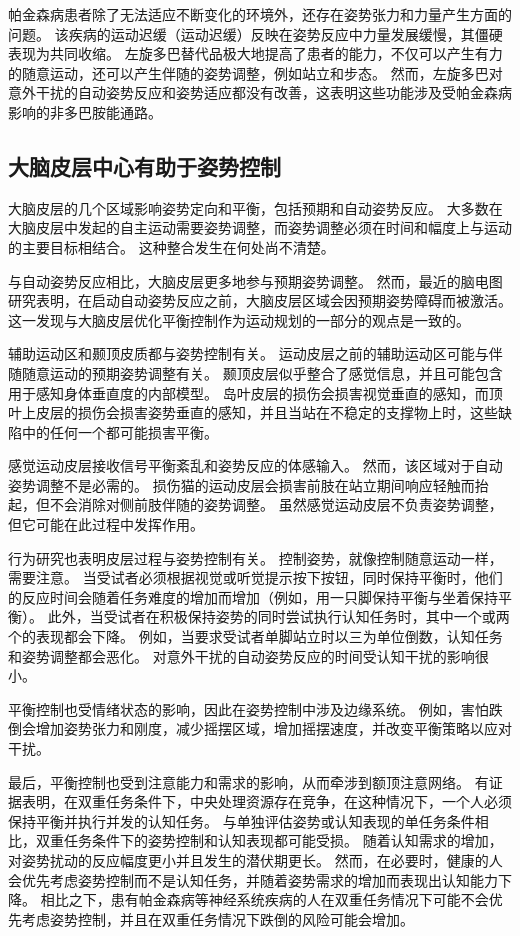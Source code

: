 帕金森病患者除了无法适应不断变化的环境外，还存在姿势张力和力量产生方面的问题。 该疾病的运动迟缓（运动迟缓）反映在姿势反应中力量发展缓慢，其僵硬表现为共同收缩。 左旋多巴替代品极大地提高了患者的能力，不仅可以产生有力的随意运动，还可以产生伴随的姿势调整，例如站立和步态。 然而，左旋多巴对意外干扰的自动姿势反应和姿势适应都没有改善，这表明这些功能涉及受帕金森病影响的非多巴胺能通路。

\subsection{大脑皮层中心有助于姿势控制}
大脑皮层的几个区域影响姿势定向和平衡，包括预期和自动姿势反应。 大多数在大脑皮层中发起的自主运动需要姿势调整，而姿势调整必须在时间和幅度上与运动的主要目标相结合。 这种整合发生在何处尚不清楚。

与自动姿势反应相比，大脑皮层更多地参与预期姿势调整。 然而，最近的脑电图研究表明，在启动自动姿势反应之前，大脑皮层区域会因预期姿势障碍而被激活。 这一发现与大脑皮层优化平衡控制作为运动规划的一部分的观点是一致的。

辅助运动区和颞顶皮质都与姿势控制有关。 运动皮层之前的辅助运动区可能与伴随随意运动的预期姿势调整有关。 颞顶皮层似乎整合了感觉信息，并且可能包含用于感知身体垂直度的内部模型。 岛叶皮层的损伤会损害视觉垂直的感知，而顶叶上皮层的损伤会损害姿势垂直的感知，并且当站在不稳定的支撑物上时，这些缺陷中的任何一个都可能损害平衡。

感觉运动皮层接收信号平衡紊乱和姿势反应的体感输入。 然而，该区域对于自动姿势调整不是必需的。 损伤猫的运动皮层会损害前肢在站立期间响应轻触而抬起，但不会消除对侧前肢伴随的姿势调整。 虽然感觉运动皮层不负责姿势调整，但它可能在此过程中发挥作用。

行为研究也表明皮层过程与姿势控制有关。 控制姿势，就像控制随意运动一样，需要注意。 当受试者必须根据视觉或听觉提示按下按钮，同时保持平衡时，他们的反应时间会随着任务难度的增加而增加（例如，用一只脚保持平衡与坐着保持平衡）。 此外，当受试者在积极保持姿势的同时尝试执行认知任务时，其中一个或两个的表现都会下降。 例如，当要求受试者单脚站立时以三为单位倒数，认知任务和姿势调整都会恶化。 对意外干扰的自动姿势反应的时间受认知干扰的影响很小。

平衡控制也受情绪状态的影响，因此在姿势控制中涉及边缘系统。 例如，害怕跌倒会增加姿势张力和刚度，减少摇摆区域，增加摇摆速度，并改变平衡策略以应对干扰。

最后，平衡控制也受到注意能力和需求的影响，从而牵涉到额顶注意网络。 有证据表明，在双重任务条件下，中央处理资源存在竞争，在这种情况下，一个人必须保持平衡并执行并发的认知任务。 与单独评估姿势或认知表现的单任务条件相比，双重任务条件下的姿势控制和认知表现都可能受损。 随着认知需求的增加，对姿势扰动的反应幅度更小并且发生的潜伏期更长。 然而，在必要时，健康的人会优先考虑姿势控制而不是认知任务，并随着姿势需求的增加而表现出认知能力下降。 相比之下，患有帕金森病等神经系统疾病的人在双重任务情况下可能不会优先考虑姿势控制，并且在双重任务情况下跌倒的风险可能会增加。

